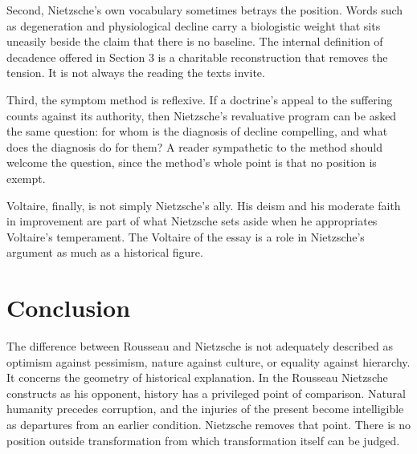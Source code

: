 \documentclass[11pt]{article}
\theoremstyle{definition}
\begin{document}
Second, Nietzsche's own vocabulary sometimes betrays the position. Words such as degeneration and physiological decline carry a biologistic weight that sits uneasily beside the claim that there is no baseline. The internal definition of decadence offered in Section 3 is a charitable reconstruction that removes the tension. It is not always the reading the texts invite.

Third, the symptom method is reflexive. If a doctrine's appeal to the suffering counts against its authority, then Nietzsche's revaluative program can be asked the same question: for whom is the diagnosis of decline compelling, and what does the diagnosis do for them? A reader sympathetic to the method should welcome the question, since the method's whole point is that no position is exempt.

Voltaire, finally, is not simply Nietzsche's ally. His deism and his moderate faith in improvement are part of what Nietzsche sets aside when he appropriates Voltaire's temperament. The Voltaire of the essay is a role in Nietzsche's argument as much as a historical figure.

\section{Conclusion}

The difference between Rousseau and Nietzsche is not adequately described as optimism against pessimism, nature against culture, or equality against hierarchy. It concerns the geometry of historical explanation. In the Rousseau Nietzsche constructs as his opponent, history has a privileged point of comparison. Natural humanity precedes corruption, and the injuries of the present become intelligible as departures from an earlier condition. Nietzsche removes that point. There is no position outside transformation from which transformation itself can be judged.
\end{document}
